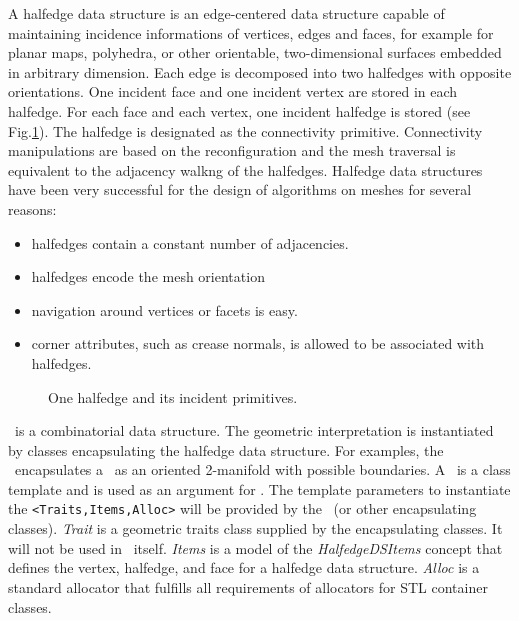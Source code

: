 A halfedge data structure \cite{hds} 
is an edge-centered data structure
capable of maintaining incidence informations of vertices, edges and
faces, for example for planar maps, polyhedra, or other orientable,
two-dimensional surfaces embedded in arbitrary dimension. Each edge is
decomposed into two halfedges with opposite orientations. One incident
face and one incident vertex are stored in each halfedge. For each
face and each vertex, one incident halfedge is stored (see
Fig.\ref{fig:halfedge}). The halfedge is designated as the
connectivity primitive. Connectivity manipulations are based
on the reconfiguration and the mesh traversal is equivalent
to the adjacency walkng of the halfedges. Halfedge data 
structures have been very successful for the design of
algorithms on meshes for several reasons:
\begin{itemize}
\item halfedges contain a constant number of adjacencies. 
\item halfedges encode the mesh orientation
\item navigation around vertices or facets is easy.
\item corner attributes, such as crease normals, is allowed 
to be associated with halfedges.
\end{itemize}

\begin{figure}[htb]
    \caption{One halfedge and its incident primitives.}
    \label{fig:halfedge}
\end{figure}
        
\cgalhds\ is a combinatorial data structure. The geometric 
interpretation is instantiated by classes encapsulating 
the halfedge data structure. For examples, the \cgalpoly\ 
encapsulates a \hds\ as an oriented 2-manifold with 
possible boundaries. A \hds\ is a class template and 
is used as an argument for \poly. The template 
parameters to instantiate the \hds\lstinline!<Traits,Items,Alloc>! 
will be provided by the \poly\ (or other encapsulating classes).
\emph{Trait} is a geometric traits class supplied by the 
encapsulating classes. It will not be used in \hds\ itself. 
\emph{Items} is a model of the \emph{HalfedgeDSItems} concept
that defines the vertex, halfedge, and face for a halfedge data
structure. \emph{Alloc} is a standard allocator that fulfills all 
requirements of allocators for STL container classes. 


